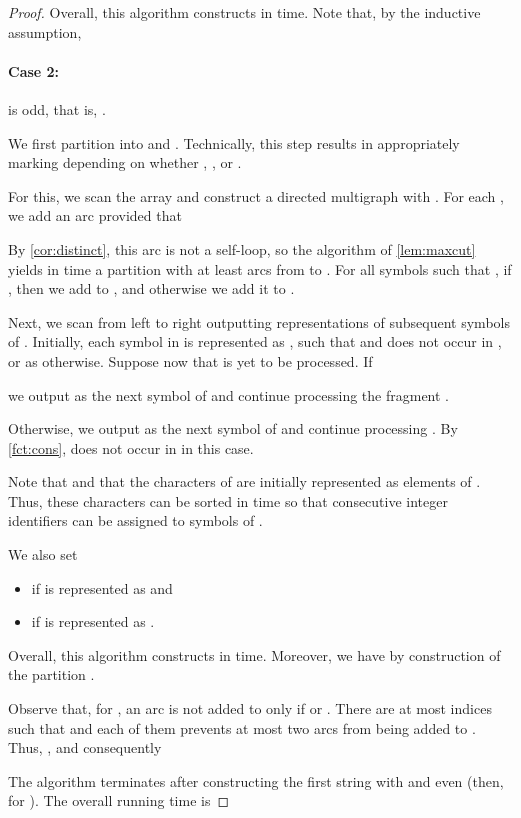 \documentclass[a4paper]{article}
\theoremstyle{definition}
\theoremstyle{remark}
\begin{document}
\begin{proof}
Overall, this algorithm constructs  in  time.
Note that, by the inductive assumption,


\paragraph{Case 2:}  is odd, that is, .

We first partition  into  and .
Technically, this step results in appropriately marking  depending on whether ,
, or .

For this, we scan the array  and construct a directed multigraph  with .
For each , we add an arc 
provided that 


By \cref{cor:distinct}, this arc is not a self-loop,
so the algorithm of \cref{lem:maxcut} yields in  time a partition  with at least 
arcs from  to . For all symbols  such that , if , then we add  to ,
and otherwise we add it to .

Next, we scan  from left to right outputting representations of subsequent symbols of .
Initially, each symbol  in  is represented as , such that  and  does not occur in , or as  otherwise.
Suppose now that  is yet to be processed.
 If
 
we output  as the next symbol of  and continue processing 
the fragment .

Otherwise, we output  as the next symbol of  and continue processing .
By \cref{fct:cons},  does not occur in  in this case.

Note that  and that the characters of  are initially represented as elements of .
Thus, these characters can be sorted in  time so that consecutive integer identifiers  can be assigned to symbols of . 

We also set 

\begin{itemize}
\item
 if  is represented as  and 

\item
 if  is represented as .
\end{itemize}

Overall, this algorithm constructs  in  time.
Moreover, we have  by construction of the partition .

Observe that, for , an arc   is not added to  
only if 
 or .
There are at most  indices  such that  and each of them prevents at most two arcs from being added to .
Thus, , and consequently 


The algorithm terminates after constructing the first string  with  and even  (then,  for ). The overall running time is 

\end{proof}
\end{document}
